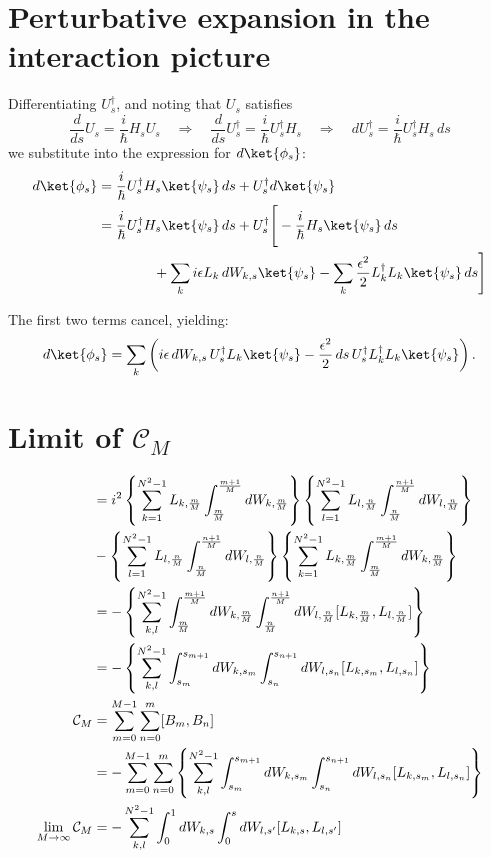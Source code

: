 \section{Perturbative expansion in the interaction picture}
Differentiating \( U_s^\dagger \), and noting that \( U_s \) satisfies
\[
\frac{d}{ds} U_s = \frac{i}{\hbar} H_s U_s \quad \Rightarrow \quad \frac{d}{ds} U_s^\dagger = \frac{i}{\hbar} U_s^\dagger H_s \quad \Rightarrow \quad 
dU_s^\dagger = \frac{i}{\hbar} U_s^\dagger H_s \, ds
\]
we substitute into the expression for \( d\ket{\phi_s} \):
\begin{align}
d \ket{\phi_s} 
&= \frac{i}{\hbar} U_s^\dagger H_s \ket{\psi_s} \, ds + U_s^\dagger d \ket{\psi_s} \notag \\
&= \frac{i}{\hbar} U_s^\dagger H_s \ket{\psi_s} \, ds 
+ U_s^\dagger \Bigg[ 
    -\frac{i}{\hbar} H_s \ket{\psi_s} \, ds 
    \\
&\hspace{4em}+ \sum_k i \epsilon L_k \, dW_{k,s} \ket{\psi_s} \notag 
    - \sum_k \frac{\epsilon^2}{2} L_k^\dagger L_k \ket{\psi_s} \, ds 
\Bigg] \notag 
\label{eq:ito_transformed}
\end{align}


The first two terms cancel, yielding:
\begin{equation}
d\ket{\phi_s} = \sum_k \left( i \epsilon \, dW_{k,s} \, U_s^\dagger L_k \ket{\psi_s} 
- \frac{\epsilon^2}{2} \, ds \, U_s^\dagger L_k^\dagger L_k \ket{\psi_s} \right).
\end{equation}

\section{Limit of $\mathcal{C}_M$}
\begin{align}
    [B_m, B_n] &= i^2 \left\{ \sum_{k=1}^{N^2 - 1} L_{k, \frac{m}{M}}\int_\frac{m}{M}^\frac{m+1}{M} dW_{k, \frac{m}{M}}\right\} \left\{ \sum_{l=1}^{N^2 - 1} L_{l, \frac{n}{M}}\int_\frac{n}{M}^\frac{n+1}{M} dW_{l, \frac{n}{M}}\right\} \notag\\
    &-\left\{ \sum_{l=1}^{N^2 - 1} L_{l, \frac{n}{M}}\int_\frac{n}{M}^\frac{n+1}{M} dW_{l, \frac{n}{M}}\right\}\left\{ \sum_{k=1}^{N^2 - 1} L_{k, \frac{m}{M}}\int_\frac{m}{M}^\frac{m+1}{M} dW_{k, \frac{m}{M}}\right\} \notag\\
    &= - \left\{ \sum_{k,l}^{N^2 - 1} \int_\frac{m}{M}^\frac{m+1}{M} dW_{k, \frac{m}{M}} \int_\frac{n}{M}^\frac{n+1}{M} dW_{l, \frac{n}{M}} [L_{k, \frac{m}{M}}, L_{l, \frac{n}{M}}] \right\} \notag\\
    &= - \left\{ \sum_{k,l}^{N^2 - 1} \int_{s_m}^{s_{m+1}} dW_{k,s_m} \int_{s_n}^{s_{n+1}} dW_{l, s_n} [L_{k, s_m}, L_{l, s_n}] \right\}\\
    \mathcal{C}_M &= \sum_{m=0}^{M-1} \sum_{n=0}^{m} [B_m, B_n] \notag\\
    &= - \sum_{m=0}^{M-1} \sum_{n=0}^{m}\left\{ \sum_{k,l}^{N^2 - 1} \int_{s_m}^{s_{m+1}} dW_{k,s_m} \int_{s_n}^{s_{n+1}} dW_{l, s_n} [L_{k, s_m}, L_{l, s_n}] \right\}\\
    \lim_{M\rightarrow\infty}\mathcal{C}_M &= - \sum_{k,l}^{N^2 - 1} \int_{0}^{1} dW_{k,s} \int_{0}^{s} dW_{l, s'} [L_{k, s}, L_{l, s'}] 
\end{align}